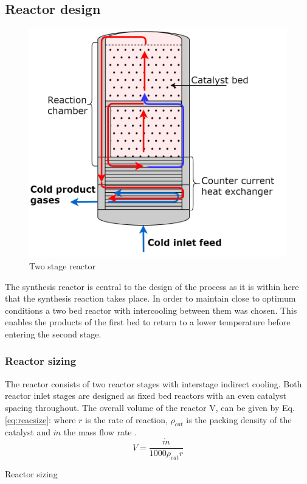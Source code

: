 \documentclass[11pt, a4paper]{article}
\begin{document}
{\subsection{Reactor design}
\begin{figure}
		\centering
		\includegraphics[width=\linewidth]{2sReactorP.png}
		\caption{Two stage reactor}
\end{figure}

The synthesis reactor is central to the design of the process as it is within here that the synthesis reaction takes place. In order to maintain close to optimum conditions  a two bed reactor with intercooling between them was chosen. This enables the products of the first bed to return to a lower temperature before entering the second stage.

\subsubsection{Reactor sizing}
The reactor consists of two reactor stages with interstage indirect cooling. Both reactor inlet stages are designed as fixed bed reactors with an even catalyst spacing throughout. The overall volume of the reactor V, can be given by Eq. \ref{eq:reacsize}: where $r$ is the rate of reaction, $\rho_{cat}$ is the packing density of the catalyst and $\dot{m}$ the mass flow rate \cite{Banares-alcantara2014}.
\begin{equation}
\label{eq:reacsize}
	V = \frac{\dot{m}}{1000\rho_{cat}r}
\end{equation}
\begin{table}[!htbp]
	\begin{center}
		\label{tab:reacreq}
		\caption{Reactor sizing}
		

\end{center}
\end{table}}
\end{document}

